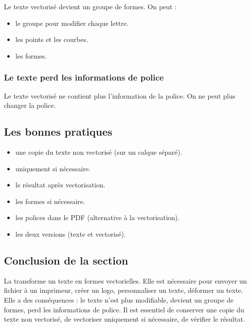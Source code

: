 Le texte vectorisé devient un groupe de formes. On peut :

\begin{itemize}
    \item {} le groupe pour modifier chaque lettre.
    \item {} les points et les courbes.
    \item {} les formes.
\end{itemize}

\subsubsection{Le texte perd les informations de police}

Le texte vectorisé ne contient plus l'information de la police. On ne peut plus changer la police.

\subsection{Les bonnes pratiques}

\begin{itemize}
    \item {} une copie du texte non vectorisé (sur un calque séparé).
    \item {} uniquement si nécessaire.
    \item {} le résultat après vectorisation.
    \item {} les formes si nécessaire.
    \item {} les polices dans le PDF (alternative à la vectorisation).
    \item {} les deux versions (texte et vectorisé).
\end{itemize}

\subsection*{Conclusion de la section}

La  transforme un texte en formes vectorielles. Elle est nécessaire pour envoyer un fichier à un imprimeur, créer un logo, personnaliser un texte, déformer un texte. Elle a des conséquences : le texte n'est plus modifiable, devient un groupe de formes, perd les informations de police. Il est essentiel de conserver une copie du texte non vectorisé, de vectoriser uniquement si nécessaire, de vérifier le résultat.


